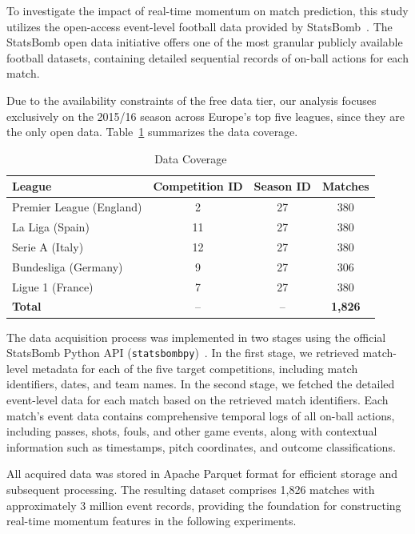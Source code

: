 \documentclass[pdflatex,sn-mathphys-num]{sn-jnl}
\theoremstyle{thmstyleone}
\theoremstyle{thmstyletwo}
\theoremstyle{thmstylethree}
\begin{document}
To investigate the impact of real-time momentum on match prediction, this study utilizes the open-access event-level football data provided by StatsBomb~\cite{statsbomb2023}. The StatsBomb open data initiative offers one of the most granular publicly available football datasets, containing detailed sequential records of on-ball actions for each match.

Due to the availability constraints of the free data tier, our analysis focuses exclusively on the 2015/16 season across Europe's top five leagues, since they are the only open data. Table~\ref{tab:data_coverage} summarizes the data coverage.

\begin{table}[htbp]
\centering
\caption{Data Coverage}
\label{tab:data_coverage}
\begin{tabular}{lccc}
\toprule
\textbf{League} & \textbf{Competition ID} & \textbf{Season ID} & \textbf{Matches} \\
\midrule
Premier League (England) & 2 & 27 & 380 \\
La Liga (Spain) & 11 & 27 & 380 \\
Serie A (Italy) & 12 & 27 & 380 \\
Bundesliga (Germany) & 9 & 27 & 306 \\
Ligue 1 (France) & 7 & 27 & 380 \\
\midrule
\textbf{Total} & -- & -- & \textbf{1,826} \\
\bottomrule
\end{tabular}
\end{table}

The data acquisition process was implemented in two stages using the official StatsBomb Python API (\texttt{statsbombpy})~\cite{statsbombpy2023}. In the first stage, we retrieved match-level metadata for each of the five target competitions, including match identifiers, dates, and team names. In the second stage, we fetched the detailed event-level data for each match based on the retrieved match identifiers. Each match's event data contains comprehensive temporal logs of all on-ball actions, including passes, shots, fouls, and other game events, along with contextual information such as timestamps, pitch coordinates, and outcome classifications.

All acquired data was stored in Apache Parquet format for efficient storage and subsequent processing. The resulting dataset comprises 1,826 matches with approximately 3 million event records, providing the foundation for constructing real-time momentum features in the following experiments.
\end{document}
